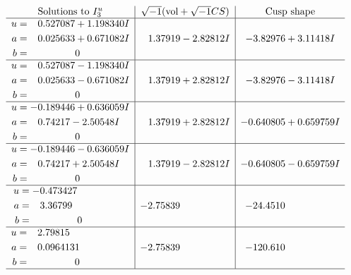 \documentclass[1p]{elsarticle_modified}
\theoremstyle{definition}
\newcommand{\I}{\sqrt{-1}}
\begin{document}
$$\begin{array}{c|c|c}  
\text{Solutions to }I^u_{3}& \I (\text{vol} + \sqrt{-1}CS) & \text{Cusp shape}\\
 \hline 
\begin{aligned}
u &= \phantom{-}0.527087 + 1.198340 I \\
a &= \phantom{-}0.025633 + 0.671082 I \\
b &= \phantom{-0.000000 } 0\end{aligned}
 & \phantom{-}1.37919 - 2.82812 I & -3.82976 + 3.11418 I \\ \hline\begin{aligned}
u &= \phantom{-}0.527087 - 1.198340 I \\
a &= \phantom{-}0.025633 - 0.671082 I \\
b &= \phantom{-0.000000 } 0\end{aligned}
 & \phantom{-}1.37919 + 2.82812 I & -3.82976 - 3.11418 I \\ \hline\begin{aligned}
u &= -0.189446 + 0.636059 I \\
a &= \phantom{-}0.74217 - 2.50548 I \\
b &= \phantom{-0.000000 } 0\end{aligned}
 & \phantom{-}1.37919 + 2.82812 I & -0.640805 + 0.659759 I \\ \hline\begin{aligned}
u &= -0.189446 - 0.636059 I \\
a &= \phantom{-}0.74217 + 2.50548 I \\
b &= \phantom{-0.000000 } 0\end{aligned}
 & \phantom{-}1.37919 - 2.82812 I & -0.640805 - 0.659759 I \\ \hline\begin{aligned}
u &= -0.473427\phantom{ +0.000000I} \\
a &= \phantom{-}3.36799\phantom{ +0.000000I} \\
b &= \phantom{-0.000000 } 0\end{aligned}
 & -2.75839\phantom{ +0.000000I} & -24.4510\phantom{ +0.000000I} \\ \hline\begin{aligned}
u &= \phantom{-}2.79815\phantom{ +0.000000I} \\
a &= \phantom{-}0.0964131\phantom{ +0.000000I} \\
b &= \phantom{-0.000000 } 0\end{aligned}
 & -2.75839\phantom{ +0.000000I} & -120.610\phantom{ +0.000000I}\\
 \hline 
 \end{array}$$\newpage
\end{document}
